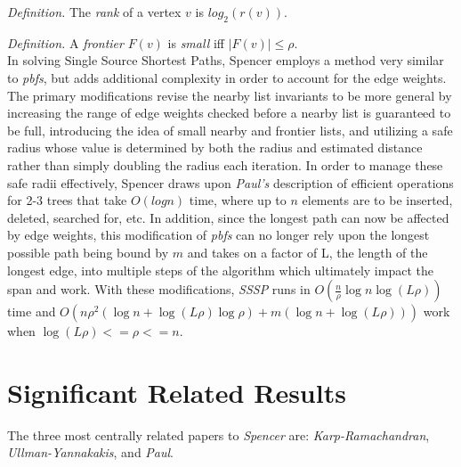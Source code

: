 \documentclass[paper=a4, fontsize=11pt]{scrartcl} %
\numberwithin{equation}{section} %
\numberwithin{figure}{section} %
\numberwithin{table}{section} %
\begin{document}
\textit{Definition.} The \textit{rank} of a vertex $v$ is $log_2(r(v))$.

\textit{Definition.} A \textit{frontier} $F(v)$ is \textit{small} iff $|F(v)|\le\rho$.\\ 

In solving Single Source Shortest Paths, Spencer employs a method very similar to \textit{pbfs}, but adds additional complexity in order to account for the edge weights. The primary modifications revise the nearby list invariants to be more general by increasing the range of edge weights checked before a nearby list is guaranteed to be full, introducing the idea of small nearby and frontier lists, and utilizing a safe radius whose value is determined by both the radius and estimated distance rather than simply doubling the radius each iteration. In order to manage these safe radii effectively, Spencer draws upon \textit{Paul's\cite{P83}} description of efficient operations for 2-3 trees that take $O(logn)$ time, where up to $n$ elements are to be inserted, deleted, searched for, etc. In addition, since the longest path can now be affected by edge weights, this modification of \textit{pbfs} can no longer rely upon the longest possible path being bound by $m$ and takes on a factor of L, the length of the longest edge, into multiple steps of the algorithm which ultimately impact the span and work. With these modifications, \textit{SSSP} runs in  $O(\frac{n}{\rho}\log{n}\log{(L\rho)})$ time and $O(n\rho^2(\log{n} + \log{(L\rho)}\log{\rho}) + m(\log{n} + \log{(L\rho)}))$ work when $\log{(L\rho)} <= \rho <= n$.


\section{Significant Related Results}

The three most centrally related papers to \textit{Spencer\cite{S97}} are:  \textit{Karp-Ramachandran\cite{KR90}}, \textit{Ullman-Yannakakis\cite{UY91}}, and \textit{Paul\cite{P83}}.
\end{document}
